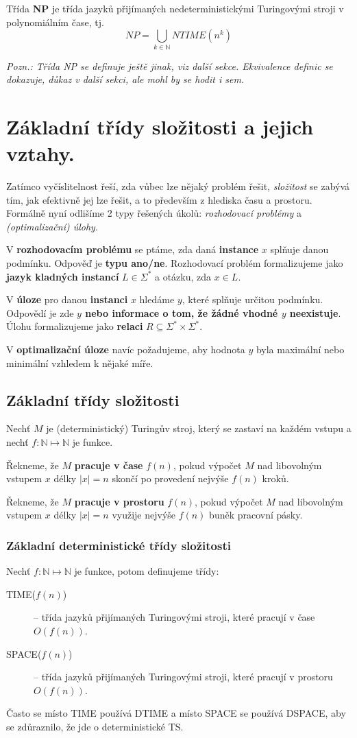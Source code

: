 \documentclass[11pt]{report} %
\newcommand{\N}{\mathbb{N}}
\numberwithin{equation}{section}
\begin{document}
Třída \textbf{NP} je třída jazyků přijímaných nedeterministickými Turingovými stroji v polynomiálním čase, tj. 
$$NP = \bigcup_{k\in\N}NTIME(n^k) $$

\textit{Pozn.: Třída NP se definuje ještě jinak, viz další sekce. Ekvivalence definic se dokazuje, důkaz v další sekci, ale mohl by se hodit i sem.}

\section{Základní třídy složitosti a jejich vztahy.}
Zatímco vyčíslitelnost řeší, zda vůbec lze nějaký problém řešit, \textit{složitost} se zabývá tím, jak efektivně jej lze řešit, a to především z hlediska času a prostoru. Formálně nyní odlišíme 2 typy řešených úkolů: \textit{rozhodovací problémy} a \textit{(optimalizační) úlohy}.

V \textbf{rozhodovacím problému} se ptáme, zda daná \textbf{instance} $x$ splňuje danou podmínku. Odpověď je \textbf{typu ano/ne}. Rozhodovací problém formalizujeme jako \textbf{jazyk kladných instancí} $L \in \Sigma^*$  a otázku, zda $x \in L.$

V \textbf{úloze} pro danou \textbf{instanci} $x$ hledáme $y$, které splňuje určitou podmínku. Odpovědí je zde  \textbf{$y$ nebo informace o tom, že žádné vhodné $y$ neexistuje}. Úlohu formalizujeme jako \textbf{relaci} $R \subseteq \Sigma^* \times \Sigma^*$.

V \textbf{optimalizační úloze} navíc požadujeme, aby hodnota $y$ byla maximální nebo minimální vzhledem k nějaké míře.


\subsection{Základní třídy složitosti}
Nechť $M$ je (deterministický) Turingův stroj, který se zastaví na každém vstupu a nechť $f : \N \mapsto \N$ je funkce.

Řekneme, že $M$ \textbf{pracuje v čase} $f(n)$, pokud výpočet $M$ nad libovolným vstupem $x$ délky $|x| = n$ skončí po provedení nejvýše $f(n)$ kroků.

Řekneme, že $M$ \textbf{pracuje v prostoru} $f(n)$, pokud výpočet $M$ nad libovolným vstupem $x$ délky $|x| = n$ využije nejvýše $f(n)$ buněk pracovní pásky.

\subsubsection{Základní deterministické třídy složitosti}
Nechť $f : \N \mapsto \N$ je funkce, potom definujeme třídy:
\begin{description}
	\item[TIME($f(n)$)] – třída jazyků přijímaných Turingovými stroji, které pracují v čase $O(f(n))$.
	\item[SPACE($f(n)$)] – třída jazyků přijímaných Turingovými stroji, které pracují v prostoru $O(f(n))$.	
\end{description}
Často se místo TIME používá DTIME a místo SPACE se používá DSPACE, aby se zdůraznilo, že jde o deterministické TS.
\end{document}
